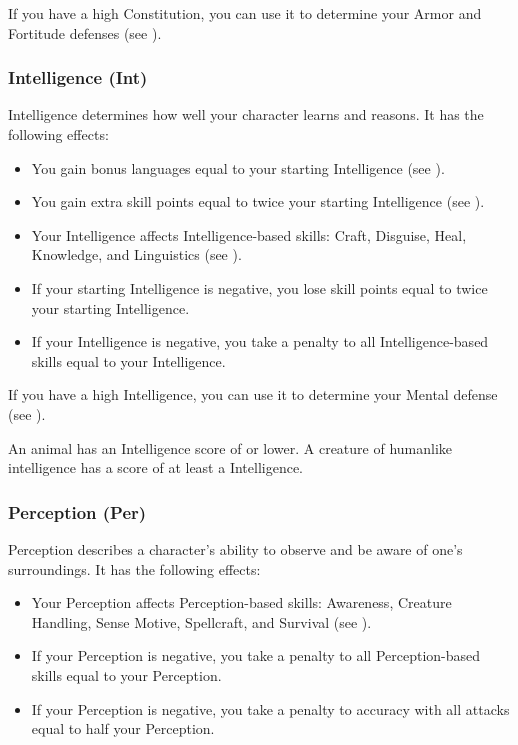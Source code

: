             If you have a high Constitution, you can use it to determine your Armor and Fortitude defenses (see ).

        \subsubsection{Intelligence (Int)}\label{Intelligence}
            Intelligence determines how well your character learns and reasons.
            It has the following effects:

            \begin{itemize}
                \item You gain bonus languages equal to your starting Intelligence (see ).
                \item You gain extra skill points equal to twice your starting Intelligence (see ).
                \item Your Intelligence affects Intelligence-based skills: Craft, Disguise, Heal, Knowledge, and Linguistics (see ).
                \item If your starting Intelligence is negative, you lose skill points equal to twice your starting Intelligence.
                \item If your Intelligence is negative, you take a penalty to all Intelligence-based skills equal to your Intelligence.
            \end{itemize}

            If you have a high Intelligence, you can use it to determine your Mental defense (see ).

            \par An animal has an Intelligence score of  or lower.
            A creature of humanlike intelligence has a score of at least a  Intelligence.

        \subsubsection{Perception (Per)}\label{Perception}
            Perception describes a character's ability to observe and be aware of one's surroundings.
            It has the following effects:
            \begin{itemize}
                \item Your Perception affects Perception-based skills: Awareness, Creature Handling, Sense Motive, Spellcraft, and Survival (see ).
                \item If your Perception is negative, you take a penalty to all Perception-based skills equal to your Perception.
                \item If your Perception is negative, you take a penalty to accuracy with all attacks equal to half your Perception.
            \end{itemize}

